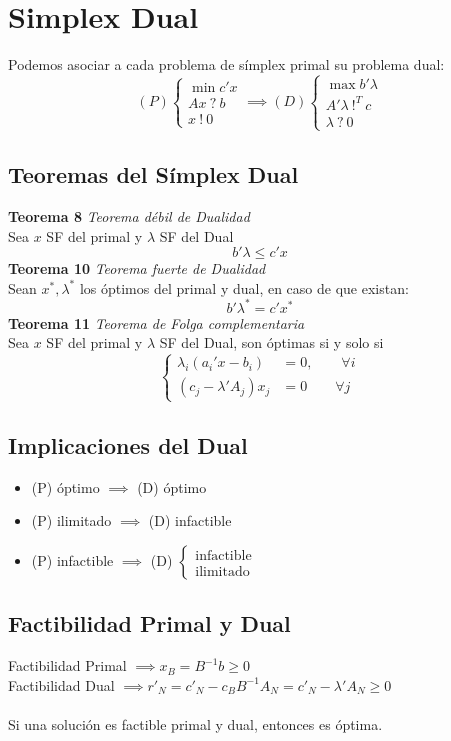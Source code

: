\documentclass{myclass}
\begin{document}
\section{Simplex Dual}
Podemos asociar a cada problema de símplex primal su problema dual:
$$
(P)
\begin{cases}
    \min c'x \\
    Ax \ ?\ b \\
    x \ ! \ 0
\end{cases}
\implies
(D)
\begin{cases}
    \max b'\lambda \\
    A'\lambda \ !^T\ c \\
    \lambda \ ? \ 0
\end{cases}
$$

\subsection{Teoremas del Símplex Dual}
\textbf{Teorema 8} \textit{Teorema débil de Dualidad} \\
Sea $x$ SF del primal y $\lambda$ SF del Dual
$$ b'\lambda \leq c'x$$
\textbf{Teorema 10} \textit{Teorema fuerte de Dualidad}\\
Sean $x^*, \lambda^*$ los óptimos del primal y dual, en caso de que existan:
$$b'\lambda^* = c'x^*$$
\textbf{Teorema 11} \textit{Teorema de Folga complementaria}\\
Sea $x$ SF del primal y $\lambda$ SF del Dual, son óptimas si y solo si
$$
\begin{cases}
\lambda_i(a_i'x - b_i) &= 0, \qquad \forall i \\
(c_j-\lambda'A_j)x_j &= 0 \qquad \forall j
\end{cases}
$$

\subsection{Implicaciones del Dual}
\begin{itemize}
    \item (P) óptimo $\implies$ (D) óptimo
    \item (P) ilimitado $\implies$ (D) infactible
    \item (P) infactible $\implies$ (D) $\begin{cases} \text{infactible} \\ \text{ilimitado} \end{cases}$
\end{itemize}
\subsection{Factibilidad Primal y Dual}
Factibilidad Primal $\implies x_B=B^{-1}b \geq 0$ \\
Factibilidad Dual $\implies r'_N = c'_N - c_B B^{-1} A_N = c'_N - \lambda' A_N \geq 0$ \\
\\
Si una solución es factible primal y dual, entonces es óptima. 
\end{document}
